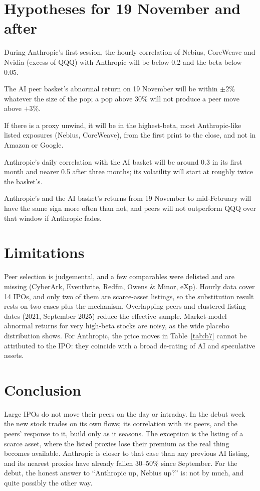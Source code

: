 \documentclass[11pt]{article}
\begin{document}
\section{Hypotheses for 19 November and after}
\begin{description}[leftmargin=1.2em,style=nextline]
\item[H1. No intraday beta.] During Anthropic's first session, the hourly correlation of Nebius, CoreWeave and Nvidia (excess of QQQ) with Anthropic will be below 0.2 and the beta below 0.05.
\item[H2. No sympathy on the day.] The AI peer basket's abnormal return on 19 November will be within $\pm2\%$ whatever the size of the pop; a pop above 30\% will not produce a peer move above $+3\%$.
\item[H3. Substitution, if any, shows up in the purest proxies.] If there is a proxy unwind, it will be in the highest-beta, most Anthropic-like listed exposures (Nebius, CoreWeave), from the first print to the close, and not in Amazon or Google.
\item[H4. Correlation builds.] Anthropic's daily correlation with the AI basket will be around 0.3 in its first month and nearer 0.5 after three months; its volatility will start at roughly twice the basket's.
\item[H5. The quarter.] Anthropic's and the AI basket's returns from 19 November to mid-February will have the same sign more often than not, and peers will not outperform QQQ over that window if Anthropic fades.
\end{description}

\section{Limitations}
Peer selection is judgemental, and a few comparables were delisted and are missing (CyberArk, Eventbrite, Redfin, Owens \& Minor, eXp). Hourly data cover 14 IPOs, and only two of them are scarce-asset listings, so the substitution result rests on two cases plus the mechanism. Overlapping peers and clustered listing dates (2021, September 2025) reduce the effective sample. Market-model abnormal returns for very high-beta stocks are noisy, as the wide placebo distribution shows. For Anthropic, the price moves in Table~\ref{tab:b7} cannot be attributed to the IPO: they coincide with a broad de-rating of AI and speculative assets.

\section{Conclusion}
Large IPOs do not move their peers on the day or intraday. In the debut week the new stock trades on its own flows; its correlation with its peers, and the peers' response to it, build only as it seasons. The exception is the listing of a scarce asset, where the listed proxies lose their premium as the real thing becomes available. Anthropic is closer to that case than any previous AI listing, and its nearest proxies have already fallen 30--50\% since September. For the debut, the honest answer to ``Anthropic up, Nebius up?'' is: not by much, and quite possibly the other way.
\end{document}
